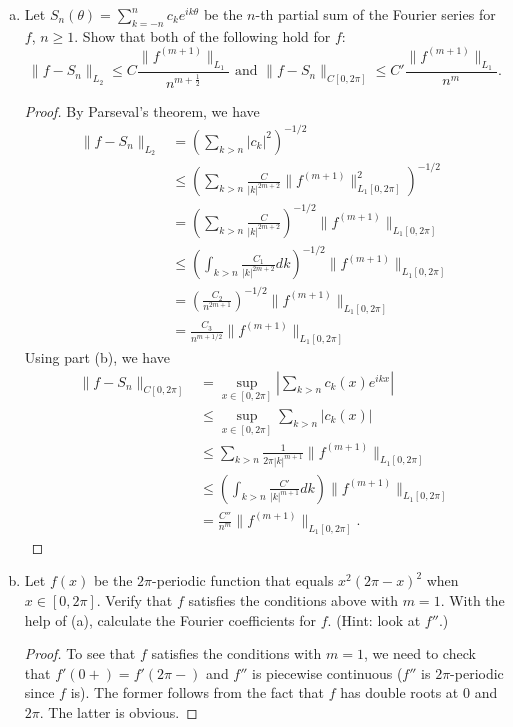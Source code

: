 \documentclass{article}
\begin{document}
\begin{enumerate}[(a)]
\item Let $S_n(\theta) = \sum_{k=-n}^n c_k e^{ik\theta}$ be the $n$-th partial sum of the Fourier series for $f$, $n \ge 1$. Show that both of the following hold for $f$:
$$\|f - S_n \|_{L_2} \le C \frac{\|f^{(m+1)}\|_{L_1}} {n^{m + \frac 1 2}} \text{ and }  \|f - S_n\|_{C[0,2\pi]} \le C' \frac{\|f^{(m+1)}\|_{L_1}}{n^m}.$$
\begin{proof}
By Parseval's theorem, we have 
\begin{align*}
\|f - S_n \|_{L_2} & = \left(\sum_{k > n} |c_k|^2\right)^{-1/2}
\\ & \le \left(\sum_{k > n} \frac C {|k|^{2m+2}} \|f^{(m+1)}\|_{L_1[0,2\pi]}^2 \right)^{-1/2}
\\ & = \left(\sum_{k > n} \frac C {|k|^{2m+2}} \right)^{-1/2} \|f^{(m+1)}\|_{L_1[0,2\pi]}
\\ & \le \left( \int_{k > n} \frac {C_1} {|k|^{2m+2}} dk \right)^{-1/2} \|f^{(m+1)}\|_{L_1[0,2\pi]}
\\ & = \left(  \frac {C_2} {n^{2m+1}} \right)^{-1/2} \|f^{(m+1)}\|_{L_1[0,2\pi]}
\\ & = \frac {C_3} {n^{m+1/2}} \|f^{(m+1)}\|_{L_1[0,2\pi]}
\end{align*}
Using part (b), we have
\begin{align*}
\|f - S_n \|_{C[0, 2\pi]} & = \sup_{x \in [0,2\pi]} \left| \sum_{k > n} c_k(x) e^{ikx} \right|
\\ & \le \sup_{x \in [0,2\pi]}  \sum_{k > n} |c_k(x)|
\\ & \le \sum_{k > n} \frac 1 {2 \pi |k|^{m+1}} \|f^{(m+1)}\|_{L_1[0,2\pi]}
\\ & \le \left(\int_{k > n} \frac {C'} {|k|^{m+1}} dk\right) \|f^{(m+1)}\|_{L_1[0,2\pi]}
\\ & = \frac {C''} {n^{m}} \|f^{(m+1)}\|_{L_1[0,2\pi]}.
\end{align*}
\end{proof}


\item Let $f(x)$ be the $2\pi$-periodic function that equals $x^2(2 \pi - x)^2$ when $x \in [0,2 \pi]$. Verify that $f$ satisfies the conditions above with $m = 1$. With the help of (a), calculate the Fourier coefficients for $f$. (Hint: look at $f''$.)

\begin{proof}
To see that $f$ satisfies the conditions with $m=1$, we need to check that  $f'(0+) = f'(2\pi -)$ and $f''$ is piecewise continuous ($f''$ is $2 \pi$-periodic since $f$ is). The former follows from the fact that $f$ has double roots at $0$ and $2 \pi$.  The latter is obvious.


\end{proof}
\end{enumerate}
\end{document}

